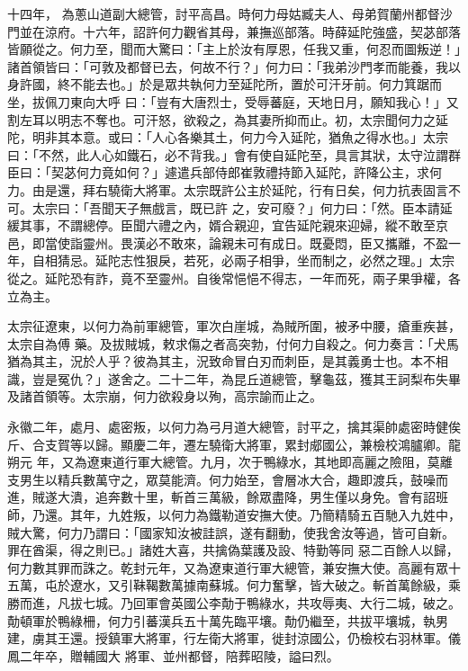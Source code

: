 \begin{pinyinscope}
 十四年，
 為蔥山道副大總管，討平高昌。時何力母姑臧夫人、母弟賀蘭州都督沙門並在涼府。十六年，詔許何力觀省其母，兼撫巡部落。時薛延陀強盛，契苾部落皆願從之。何力至，聞而大驚曰：「主上於汝有厚恩，任我又重，何忍而圖叛逆！」諸首領皆曰：「可敦及都督已去，何故不行？」何力曰：「我弟沙門孝而能養，我以身許國，終不能去也。」於是眾共執何力至延陀所，置於可汗牙前。何力箕踞而坐，拔佩刀東向大呼
 曰：「豈有大唐烈士，受辱蕃庭，天地日月，願知我心！」又割左耳以明志不奪也。可汗怒，欲殺之，為其妻所抑而止。初，太宗聞何力之延陀，明非其本意。或曰：「人心各樂其土，何力今入延陀，猶魚之得水也。」太宗曰：「不然，此人心如鐵石，必不背我。」會有使自延陀至，具言其狀，太守泣謂群臣曰：「契苾何力竟如何？」遽遣兵部侍郎崔敦禮持節入延陀，許降公主，求何力。由是還，拜右驍衛大將軍。太宗既許公主於延陀，行有日矣，何力抗表固言不可。太宗曰：「吾聞天子無戲言，既已許
 之，安可廢？」何力曰：「然。臣本請延緩其事，不謂總停。臣聞六禮之內，婿合親迎，宜告延陀親來迎婦，縱不敢至京邑，即當使詣靈州。畏漢必不敢來，論親未可有成日。既憂悶，臣又攜離，不盈一年，自相猜忌。延陀志性狠戾，若死，必兩子相爭，坐而制之，必然之理。」太宗從之。延陀恐有詐，竟不至靈州。自後常悒悒不得志，一年而死，兩子果爭權，各立為主。



 太宗征遼東，以何力為前軍總管，軍次白崖城，為賊所圍，被矛中腰，瘡重疾甚，太宗自為傅
 藥。及拔賊城，敕求傷之者高突勃，付何力自殺之。何力奏言：「犬馬猶為其主，況於人乎？彼為其主，況致命冒白刃而刺臣，是其義勇士也。本不相識，豈是冤仇？」遂舍之。二十二年，為昆丘道總管，擊龜茲，獲其王訶梨布失畢及諸首領等。太宗崩，何力欲殺身以殉，高宗諭而止之。



 永徽二年，處月、處密叛，以何力為弓月道大總管，討平之，擒其渠帥處密時健俟斤、合支賀等以歸。顯慶二年，遷左驍衛大將軍，累封郕國公，兼檢校鴻臚卿。龍朔元
 年，又為遼東道行軍大總管。九月，次于鴨綠水，其地即高麗之險阻，莫離支男生以精兵數萬守之，眾莫能濟。何力始至，會層冰大合，趣即渡兵，鼓噪而進，賊遂大潰，追奔數十里，斬首三萬級，餘眾盡降，男生僅以身免。會有詔班師，乃還。其年，九姓叛，以何力為鐵勒道安撫大使。乃簡精騎五百馳入九姓中，賊大驚，何力乃謂曰：「國家知汝被詿誤，遂有翻動，使我舍汝等過，皆可自新。罪在酋渠，得之則已。」諸姓大喜，共擒偽葉護及設、特勤等同
 惡二百餘人以歸，何力數其罪而誅之。乾封元年，又為遼東道行軍大總管，兼安撫大使。高麗有眾十五萬，屯於遼水，又引靺鞨數萬據南蘇城。何力奮擊，皆大破之。斬首萬餘級，乘勝而進，凡拔七城。乃回軍會英國公李勣于鴨綠水，共攻辱夷、大行二城，破之。勣頓軍於鴨綠柵，何力引蕃漢兵五十萬先臨平壤。勣仍繼至，共拔平壤城，執男建，虜其王還。授鎮軍大將軍，行左衛大將軍，徙封涼國公，仍檢校右羽林軍。儀鳳二年卒，贈輔國大
 將軍、並州都督，陪葬昭陵，謚曰烈。




\end{pinyinscope}
